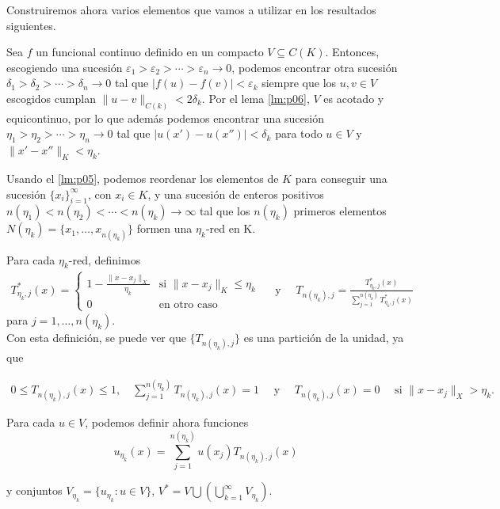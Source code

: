 \begin{definicion}
Construiremos ahora varios elementos que vamos a utilizar en los resultados siguientes.  

Sea $f$ un funcional continuo definido en un compacto $V\subseteq C(K)$. Entonces, escogiendo una sucesión $\varepsilon_{1}>\varepsilon_{2}>\cdots>\varepsilon_{n} \rightarrow 0$, podemos encontrar otra sucesión $\delta_{1}>\delta_{2}>\cdots>\delta_{n} \rightarrow 0$ tal que $\vert f(u) - f(v) \vert < \varepsilon_{k}$ siempre que los $u,v\in V$ escogidos cumplan $\parallel u - v\parallel_{C(k)} < 2\delta_{k}$. Por el lema \autoref{lm:p06}, $V$ es acotado y equicontinuo, por lo que además podemos encontrar una sucesión $\eta_{1}>\eta_{2}>\cdots>\eta_{n} \rightarrow 0$ tal que $\vert u(x') - u(x'')\vert < \delta_{k}$ para todo $u\in V$ y $\parallel x' - x''\parallel_{K} < \eta_{k}$. 

Usando el \autoref{lm:p05}, podemos reordenar los elementos de $K$ para conseguir una sucesión $\{x_{i}\}_{i=1}^{\infty}$, con $x_{i}\in K$, y una sucesión de enteros positivos $n(\eta_{1})<n(\eta_{2})<\cdots <n(\eta_{k}) \rightarrow \infty$ tal que los $n(\eta_{k})$ primeros elementos $N(\eta_{k}) = \{ x_{1}, \dots , x_{n(\eta_{k})}\}$ formen una $\eta_{k}$-red en K.  

Para cada $\eta_{k}$-red, definimos 
\begin{gather}
T_{\eta_{k},j}^{*}(x) = \begin{cases}
	1-\frac{\parallel x-x_{j}\parallel_{X}}{\eta_{k}} & \text{si }  \parallel x - x_{j}\parallel_{K} \leq \eta_{k} \\
	0 & \text{en otro caso } 		\end{cases} \quad \text{ y } \quad
T_{n(\eta_{k}),j} = \frac{T_{\eta_{k},j}^{*}(x)}{\sum_{j=1}^{n(\eta_{k})}T_{\eta_{k},j}^{*}(x)}
\end{gather}
para $j=1,\dots,n(\eta_{k})$. \\

Con esta definición, se puede ver que $\{T_{n(\eta_{k}),j}\}$ es una partición de la unidad, ya que

\begin{gather}
0 \leq T_{n(\eta_{k}),j}(x) \leq 1, \quad 
\sum_{j=1}^{n(\eta_{k})} T_{n(\eta_{k}),j}(x) = 1 \quad \text{ y } \quad
T_{n(\eta_{k}),j}(x) = 0\quad  \text{ si } \parallel x - x_{j}\parallel_{X} > \eta_{k}.
\end{gather}

Para cada $u\in V$, podemos definir ahora funciones 
\begin{equation}
u_{\eta_{k}}(x) = \sum_{j=1}^{n(\eta_{k})} u(x_{j})T_{n(\eta_{k}),j}(x)
\end{equation}

y conjuntos $V_{\eta_{k}} = \{ u_{\eta_{k}} : u\in V\}$, $V^{*} = V \bigcup(\bigcup_{k=1}^{\infty} V_{\eta_{k}})$.

\end{definicion}
